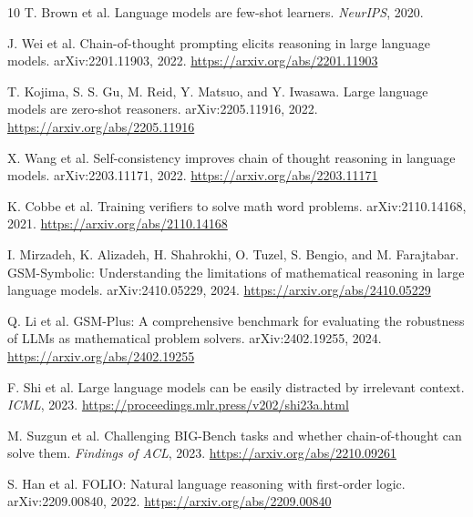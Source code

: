 \documentclass[10pt,twocolumn]{article}
\begin{document}
\begin{thebibliography}{10}
T. Brown et al. Language models are few-shot learners. \textit{NeurIPS}, 2020.

J. Wei et al. Chain-of-thought prompting elicits reasoning in large language models. arXiv:2201.11903, 2022. \url{https://arxiv.org/abs/2201.11903}

T. Kojima, S. S. Gu, M. Reid, Y. Matsuo, and Y. Iwasawa. Large language models are zero-shot reasoners. arXiv:2205.11916, 2022. \url{https://arxiv.org/abs/2205.11916}

X. Wang et al. Self-consistency improves chain of thought reasoning in language models. arXiv:2203.11171, 2022. \url{https://arxiv.org/abs/2203.11171}

K. Cobbe et al. Training verifiers to solve math word problems. arXiv:2110.14168, 2021. \url{https://arxiv.org/abs/2110.14168}

I. Mirzadeh, K. Alizadeh, H. Shahrokhi, O. Tuzel, S. Bengio, and M. Farajtabar. GSM-Symbolic: Understanding the limitations of mathematical reasoning in large language models. arXiv:2410.05229, 2024. \url{https://arxiv.org/abs/2410.05229}

Q. Li et al. GSM-Plus: A comprehensive benchmark for evaluating the robustness of LLMs as mathematical problem solvers. arXiv:2402.19255, 2024. \url{https://arxiv.org/abs/2402.19255}

F. Shi et al. Large language models can be easily distracted by irrelevant context. \textit{ICML}, 2023. \url{https://proceedings.mlr.press/v202/shi23a.html}

M. Suzgun et al. Challenging BIG-Bench tasks and whether chain-of-thought can solve them. \textit{Findings of ACL}, 2023. \url{https://arxiv.org/abs/2210.09261}

S. Han et al. FOLIO: Natural language reasoning with first-order logic. arXiv:2209.00840, 2022. \url{https://arxiv.org/abs/2209.00840}
\end{thebibliography}
\end{document}
